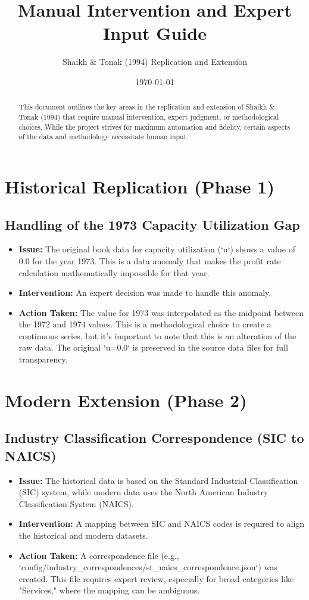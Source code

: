 \documentclass[12pt,a4paper]{article}
\title{Manual Intervention and Expert Input Guide}
\author{Shaikh \& Tonak (1994) Replication and Extension}
\date{\today}
\begin{document}
\maketitle

\begin{abstract}
This document outlines the key areas in the replication and extension of Shaikh \& Tonak (1994) that require manual intervention, expert judgment, or methodological choices. While the project strives for maximum automation and fidelity, certain aspects of the data and methodology necessitate human input.
\end{abstract}

\section{Historical Replication (Phase 1)}

\subsection{Handling of the 1973 Capacity Utilization Gap}
\begin{itemize}
    \item \textbf{Issue:} The original book data for capacity utilization (`u`) shows a value of 0.0 for the year 1973. This is a data anomaly that makes the profit rate calculation mathematically impossible for that year.
    \item \textbf{Intervention:} An expert decision was made to handle this anomaly.
    \item \textbf{Action Taken:} The value for 1973 was interpolated as the midpoint between the 1972 and 1974 values. This is a methodological choice to create a continuous series, but it's important to note that this is an alteration of the raw data. The original `u=0.0` is preserved in the source data files for full transparency.
\end{itemize}

\section{Modern Extension (Phase 2)}

\subsection{Industry Classification Correspondence (SIC to NAICS)}
\begin{itemize}
    \item \textbf{Issue:} The historical data is based on the Standard Industrial Classification (SIC) system, while modern data uses the North American Industry Classification System (NAICS).
    \item \textbf{Intervention:} A mapping between SIC and NAICS codes is required to align the historical and modern datasets.
    \item \textbf{Action Taken:} A correspondence file (e.g., `config/industry_correspondences/st_naics_correspondence.json`) was created. This file requires expert review, especially for broad categories like "Services," where the mapping can be ambiguous.
\end{itemize}
\end{document}
